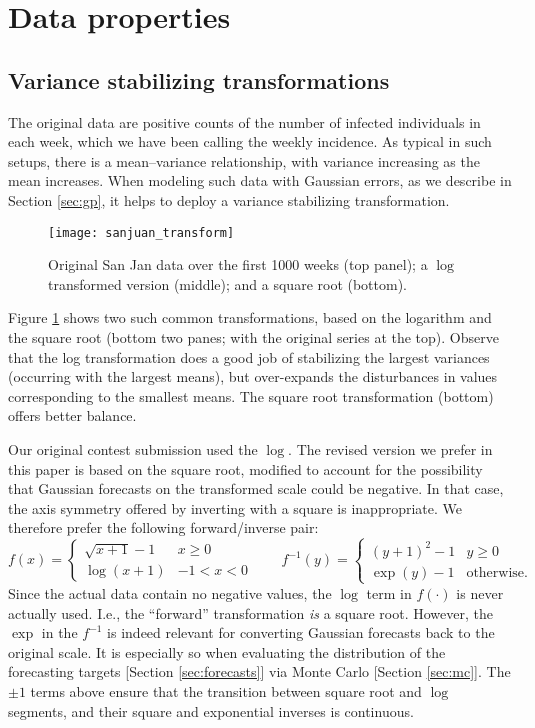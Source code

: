 \documentclass[12pt]{article}
\begin{document}
\appendix

\renewcommand{\thefigure}{A\arabic{figure}}
\setcounter{figure}{0}

\section{Data properties}

\subsection{Variance stabilizing transformations}
\label{sec:transform}

The original data are positive counts of the number of infected individuals in
each week, which we have been calling the weekly incidence.  As typical in
such setups, there is a mean--variance relationship, with variance increasing
as the mean increases.  When modeling such data with Gaussian errors, as we
describe in Section \ref{sec:gp}, it helps to deploy a variance stabilizing
transformation.
\begin{figure}[ht!]
\centering
\texttt{[image: sanjuan\_transform]}
\caption{Original San Jan data over the first 1000 weeks (top panel); a $\log$
transformed version (middle); and a square root (bottom).}
\label{f:transform}
\end{figure}
Figure \ref{f:transform} shows two such common transformations, based on the
logarithm and the square root (bottom two panes; with the original series at
the top).  Observe that the log transformation does a good job of stabilizing
the largest variances (occurring with the largest means), but over-expands the
disturbances in values corresponding to the smallest means.  The square root
transformation (bottom) offers better balance.

Our original contest submission used the $\log$.  The revised version we
prefer in this paper is based on the square root, modified to account
for the possibility that Gaussian forecasts on the transformed scale could be
negative.  In that case, the axis symmetry offered by inverting with a square
is inappropriate.  We therefore prefer the following forward/inverse pair:
\[
f(x) = \left\{
\begin{array}{cc}
\sqrt{x+1}-1 & x \geq 0 \\
\log(x+1) & -1 < x < 0
\end{array}
\right.
\quad\quad
f^{-1}(y) = \left\{
\begin{array}{cl}
(y+1)^2-1 & y \geq 0 \\
\exp(y)-1 & \mbox{otherwise}.
\end{array}
\right.
\]
Since the actual data contain no negative values, the $\log$ term in
$f(\cdot)$ is never actually used.  I.e., the ``forward'' transformation {\em
is} a square root.   However, the $\exp$ in the $f^{-1}$ is indeed relevant
for converting Gaussian forecasts back to the original scale.  It is
especially so when evaluating the distribution of the forecasting targets
[Section \ref{sec:forecasts}] via Monte Carlo [Section \ref{sec:mc}].  The
$\pm 1$ terms above ensure that the transition between square root and $\log$
segments, and their square and exponential inverses is continuous.
\end{document}
